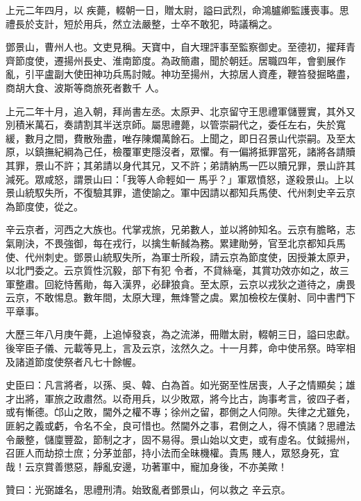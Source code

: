 \begin{pinyinscope}
 上元二年四月，以
 疾薨，輟朝一日，贈太尉，謚曰武烈，命鴻臚卿監護喪事。思禮長於支計，短於用兵，然立法嚴整，士卒不敢犯，時議稱之。



 鄧景山，曹州人也。文吏見稱。天寶中，自大理評事至監察御史。至德初，擢拜青齊節度使，遷揚州長史、淮南節度。為政簡肅，聞於朝廷。居職四年，會劉展作亂，引平盧副大使田神功兵馬討賊。神功至揚州，大掠居人資產，鞭笞發掘略盡，商胡大食、波斯等商旅死者數千
 人。



 上元二年十月，追入朝，拜尚書左丞。太原尹、北京留守王思禮軍儲豐實，其外又別積米萬石，奏請割其半送京師。屬思禮薨，以管崇嗣代之，委任左右，失於寬緩，數月之間，費散殆盡，唯存陳爛萬餘石。上聞之，即日召景山代崇嗣。及至太原，以鎮撫紀綱為己任，檢覆軍吏隱沒者，眾懼。有一偏將抵罪當死，諸將各請贖其罪，景山不許；其弟請以身代其兄，又不許；弟請納馬一匹以贖兄罪，景山許其減死。眾咸怒，謂景山曰：「我等人命輕如一
 馬乎？」軍眾憤怒，遂殺景山。上以景山統馭失所，不復驗其罪，遣使諭之。軍中因請以都知兵馬使、代州刺史辛云京為節度使，從之。



 辛云京者，河西之大族也。代掌戎旅，兄弟數人，並以將帥知名。云京有膽略，志氣剛決，不畏強御，每在戎行，以擒生斬馘為務。累建勛勞，官至北京都知兵馬使、代州刺史。鄧景山統馭失所，為軍士所殺，請云京為節度使，因授兼太原尹，以北門委之。云京質性沉毅，部下有犯
 令者，不貸絲毫，其賞功效亦如之，故三軍整肅。回紇恃舊勛，每入漢界，必肆狼貪。至太原，云京以戎狄之道待之，虜畏云京，不敢惕息。數年間，太原大理，無烽警之虞。累加檢校左僕射、同中書門下平章事。



 大歷三年八月庚午薨，上追悼發哀，為之流涕，冊贈太尉，輟朝三日，謚曰忠獻。後宰臣子儀、元載等見上，言及云京，泫然久之。十一月葬，命中使吊祭。時宰相及諸道節度使祭者凡七十餘幄。



 史臣曰：凡言將者，以孫、吳、韓、白為首。如光弼至性居喪，人子之情顯矣；雄才出將，軍旅之政肅然。以奇用兵，以少敗眾，將今比古，詢事考言，彼四子者，或有慚德。邙山之敗，閫外之權不專；徐州之留，郡側之人伺隙。失律之尤雖免，匪躬之義或虧，令名不全，良可惜也。然閫外之事，君側之人，得不慎諸？思禮法令嚴整，儲廩豐盈，節制之才，固不易得。景山始以文吏，或有虛名。仗鉞揚州，召匪人而劫掠士庶；分茅並部，持小法而全昧機權。貴馬
 賤人，眾怒身死，宜哉！云京賞善懲惡，靜亂安邊，功著軍中，寵加身後，不亦美歟！



 贊曰：光弼雄名，思禮刑清。始致亂者鄧景山，何以救之
 辛云京。



\end{pinyinscope}